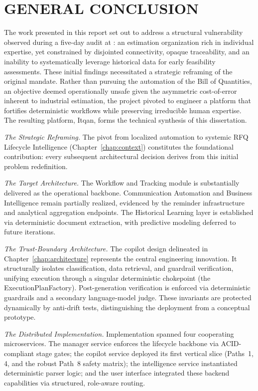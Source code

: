 \chapter*{GENERAL CONCLUSION}
\adjustmtc
\thispagestyle{MyStyle}

The work presented in this report set out to address a structural vulnerability observed during a five-day audit at \clientCompany: an estimation organization rich in individual expertise, yet constrained by disjointed connectivity, opaque traceability, and an inability to systematically leverage historical data for early feasibility assessments. These initial findings necessitated a strategic reframing of the original mandate. Rather than pursuing the automation of the Bill of Quantities, an objective deemed operationally unsafe given the asymmetric cost-of-error inherent to industrial estimation, the project pivoted to engineer a platform that fortifies deterministic workflows while preserving irreducible human expertise. The resulting platform, Itqan, forms the technical synthesis of this dissertation.

\textit{The Strategic Reframing.} The pivot from localized automation to systemic RFQ Lifecycle Intelligence (Chapter~\ref{chap:context}) constitutes the foundational contribution: every subsequent architectural decision derives from this initial problem redefinition.

\textit{The Target Architecture.} The Workflow and Tracking module is substantially delivered as the operational backbone. Communication Automation and Business Intelligence remain partially realized, evidenced by the reminder infrastructure and analytical aggregation endpoints. The Historical Learning layer is established via deterministic document extraction, with predictive modeling deferred to future iterations.

\textit{The Trust-Boundary Architecture.} The copilot design delineated in Chapter~\ref{chap:architecture} represents the central engineering innovation. It structurally isolates classification, data retrieval, and guardrail verification, unifying execution through a singular deterministic chokepoint (the ExecutionPlanFactory). Post-generation verification is enforced via deterministic guardrails and a secondary language-model judge. These invariants are protected dynamically by anti-drift tests, distinguishing the deployment from a conceptual prototype.

\textit{The Distributed Implementation.} Implementation spanned four cooperating microservices. The manager service enforces the lifecycle backbone via ACID-compliant stage gates; the copilot service deployed its first vertical slice (Paths~1, 4, and the robust Path~8 safety matrix); the intelligence service instantiated deterministic parser logic; and the user interface integrated these backend capabilities via structured, role-aware routing.

